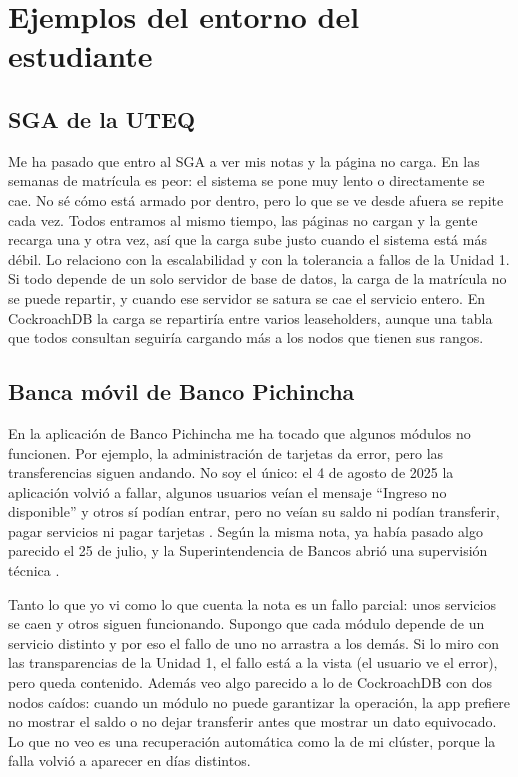 \documentclass[12pt,a4paper]{article}
\begin{document}
\section{Ejemplos del entorno del estudiante}

\subsection{SGA de la UTEQ}

Me ha pasado que entro al SGA a ver mis notas y la página no carga. En las semanas de matrícula es peor: el sistema se pone muy lento o directamente se cae. No sé cómo está armado por dentro, pero lo que se ve desde afuera se repite cada vez. Todos entramos al mismo tiempo, las páginas no cargan y la gente recarga una y otra vez, así que la carga sube justo cuando el sistema está más débil. Lo relaciono con la escalabilidad y con la tolerancia a fallos de la Unidad 1. Si todo depende de un solo servidor de base de datos, la carga de la matrícula no se puede repartir, y cuando ese servidor se satura se cae el servicio entero. En CockroachDB la carga se repartiría entre varios leaseholders, aunque una tabla que todos consultan seguiría cargando más a los nodos que tienen sus rangos.

\subsection{Banca móvil de Banco Pichincha}

En la aplicación de Banco Pichincha me ha tocado que algunos módulos no funcionen. Por ejemplo, la administración de tarjetas da error, pero las transferencias siguen andando. No soy el único: el 4 de agosto de 2025 la aplicación volvió a fallar, algunos usuarios veían el mensaje \enquote{Ingreso no disponible} y otros sí podían entrar, pero no veían su saldo ni podían transferir, pagar servicios ni pagar tarjetas \cite{vistazo2025pichincha}. Según la misma nota, ya había pasado algo parecido el 25 de julio, y la Superintendencia de Bancos abrió una supervisión técnica \cite{vistazo2025pichincha}.

Tanto lo que yo vi como lo que cuenta la nota es un fallo parcial: unos servicios se caen y otros siguen funcionando. Supongo que cada módulo depende de un servicio distinto y por eso el fallo de uno no arrastra a los demás. Si lo miro con las transparencias de la Unidad 1, el fallo está a la vista (el usuario ve el error), pero queda contenido. Además veo algo parecido a lo de CockroachDB con dos nodos caídos: cuando un módulo no puede garantizar la operación, la app prefiere no mostrar el saldo o no dejar transferir antes que mostrar un dato equivocado. Lo que no veo es una recuperación automática como la de mi clúster, porque la falla volvió a aparecer en días distintos.
\end{document}

